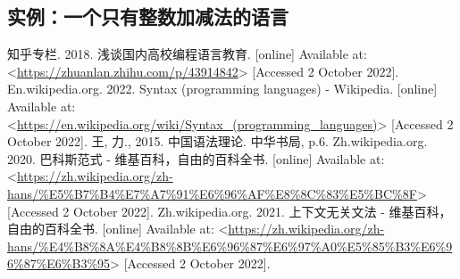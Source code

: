 \documentclass[../main.tex]{subfiles}
\begin{document}
  \subsection{实例：一个只有整数加减法的语言}

  \begin{thebibliography}{5}
     知乎专栏. 2018. 浅谈国内高校编程语言教育. [online] Available at: <\url{https://zhuanlan.zhihu.com/p/43914842}> [Accessed 2 October 2022].
     En.wikipedia.org. 2022. Syntax (programming languages) - Wikipedia. [online] Available at: <\url{https://en.wikipedia.org/wiki/Syntax_(programming_languages)}> [Accessed 2 October 2022].
     王, 力., 2015. 中国语法理论. 中华书局, p.6.
     Zh.wikipedia.org. 2020. 巴科斯范式 - 维基百科，自由的百科全书. [online] Available at: <\url{https://zh.wikipedia.org/zh-hans/%E5%B7%B4%E7%A7%91%E6%96%AF%E8%8C%83%E5%BC%8F}> [Accessed 2 October 2022]. 
     Zh.wikipedia.org. 2021. 上下文无关文法 - 维基百科，自由的百科全书. [online] Available at: <\url{https://zh.wikipedia.org/zh-hans/%E4%B8%8A%E4%B8%8B%E6%96%87%E6%97%A0%E5%85%B3%E6%96%87%E6%B3%95}> [Accessed 2 October 2022].
  \end{thebibliography}
\end{document}
